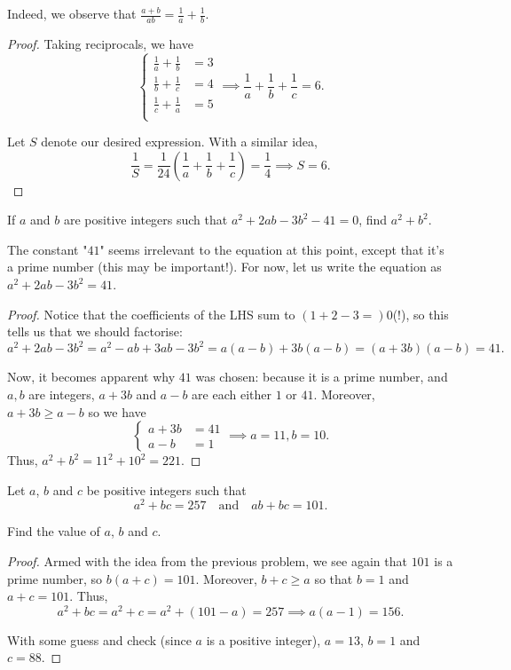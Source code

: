 \documentclass[../jarvis.tex]{subfiles}
\begin{document}
Indeed, we observe that $\frac{a+b}{ab}=\frac{1}{a}+\frac{1}{b}$.
\begin{proof}
    Taking reciprocals, we have
    $$
    \begin{cases*}
        \frac{1}{a}+\frac{1}{b} &= 3\\
        \frac{1}{b}+\frac{1}{c} &= 4\\
        \frac{1}{c}+\frac{1}{a} &= 5 \\
    \end{cases*}
    \implies \frac{1}{a}+\frac{1}{b}+\frac{1}{c}=6.$$
    
    Let $S$ denote our desired expression. With a similar idea, 
    $$\frac{1}{S}=\frac{1}{24}\left(\frac{1}{a}+\frac{1}{b}+\frac{1}{c}\right)=\frac{1}{4} \implies S=\boxed{6}.$$
\end{proof}

\begin{example}[2013 SMO(J) P32]
    If $a$ and $b$ are positive integers such that $a^2+2ab-3b^2-41=0$, find $a^2+b^2$.
\end{example}
The constant "$41$" seems irrelevant to the equation at this point, except that it's a prime number (this may be important!). For now, let us write the equation as $a^2+2ab-3b^2=41$.

\begin{proof}
    Notice that the coefficients of the LHS sum to $(1+2-3=)0$(!), so this tells us that we should factorise:
$$a^2+2ab-3b^2=a^2-ab+3ab-3b^2=a(a-b)+3b(a-b)=(a+3b)(a-b)=41.$$

Now, it becomes apparent why $41$ was chosen: because it is a prime number, and $a,b$ are integers, $a+3b$ and $a-b$ are each either $1$ or $41$. Moreover, $a+3b \geq a-b$ so we have
$$
\begin{cases}
    a+3b&=41 \\
    a-b&=1
\end{cases} \implies a=11, b=10.
$$
Thus, $a^2+b^2=11^2+10^2=\boxed{221}$.
\end{proof}


\begin{example}[2017 SMO(J) P20]
    Let $a$, $b$ and $c$ be positive integers such that
    $$a^2+bc=257\quad\text{and}\quad ab+bc=101.$$

    Find the value of $a$, $b$ and $c$.
\end{example}
\begin{proof}
    Armed with the idea from the previous problem, we see again that $101$ is a prime number, so $b(a+c)=101$. Moreover, $b+c\geq a$ so that $b=1$ and $a+c=101$. Thus, $$a^2+bc=a^2+c=a^2+(101-a)=257 \implies a(a-1)=156.$$

    With some guess and check (since $a$ is a positive integer), $a=13$, $b=1$ and $c=88$.
\end{proof}
\end{document}
